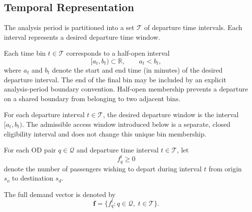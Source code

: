 \subsection{Temporal Representation}

The analysis period is partitioned into a set $\mathcal{T}$ of departure time intervals. Each interval represents a desired departure time window.

\begin{definition}
Each time bin $t\in\mathcal{T}$ corresponds to a half-open interval
\[
[a_t,b_t)\subset\mathbb{R},
\qquad a_t<b_t,
\]
where $a_t$ and $b_t$ denote the start and end time (in minutes) of the
desired departure interval. The end of the final bin may be included by an
explicit analysis-period boundary convention. Half-open membership prevents a
departure on a shared boundary from belonging to two adjacent bins.
\end{definition}

For each departure interval $t\in\mathcal{T}$, the desired departure window is the
interval $[a_t,b_t)$. The admissible access window introduced below is a
separate, closed eligibility interval and does not change this unique bin
membership.

\begin{definition}[OD demand]
For each OD pair $q \in \mathcal{Q}$ and departure time interval $t \in \mathcal{T}$, let
\[
f_q^t \ge 0
\]
denote the number of passengers wishing to depart during interval $t$ from origin $s_o$ to destination $s_d$.
\end{definition}

The full demand vector is denoted by
\[
\bm{f} = \{ f_q^t : q \in \mathcal{Q},\; t \in \mathcal{T} \}.
\]

